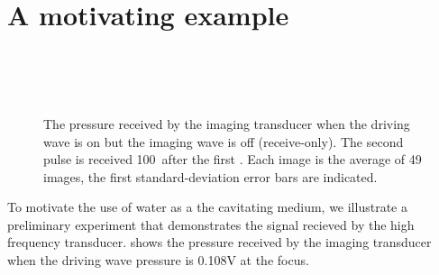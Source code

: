 \section{A motivating  example}\label{sec:WE:motivating_ex}

\begin{figure}[t]%
  \centering
  \subfloat[1st pulse - 100]{
    \label{fig:av:108:100_ex:first}
    }
 \quad
  \subfloat[2nd pulse - 100]{
    \label{fig:av:108:100_ex:second}
    }\\
 \subfloat[1st pulse - 12000]{
    \label{fig:av:108:12000_ex:first}
    }
 \quad
  \subfloat[2nd pulse - 12000]{
    \label{fig:av:108:12000_ex:second}
    }\\
  \subfloat[2nd pulse - 12000]{
    \label{fig:av:108:12000_ex:sub}
    }\\
  \caption{
    The pressure received  by the imaging transducer when the driving wave is on but the imaging wave is off (receive-only).
    The second pulse  is received \unit{100}\micro\second\ after the first .
    Each image is the average of 49 images, the first standard-deviation error bars are indicated.
  }
  \label{fig:av:108:100_ex}
\end{figure}




To motivate the use of water as a the cavitating medium, 
we illustrate a preliminary experiment that demonstrates the signal recieved by the high frequency transducer.
 shows the pressure received by the imaging transducer when the driving wave pressure is 0.108V at the focus.

